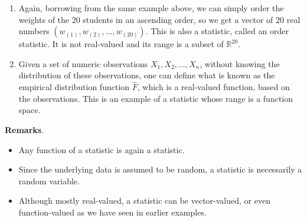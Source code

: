 \documentclass[12pt]{article}
\begin{document}
\begin{enumerate}
\item Again, borrowing from the same example above, we can simply order the weights of the 20 students in an ascending order, so we get a vector of 20 real numbers $(w_{(1)},w_{(2)},\ldots,w_{(20)})$.  This is also a statistic, called an order statistic.  It is not real-valued and its range is a subset of $\mathbb{R}^{20}$.
\item Given a set of numeric observations $X_1,X_2,\ldots,X_n$, without knowing the distribution of these observations, one can define what is known as the empirical distribution function $\hat{F}$, which is a real-valued function, based on the observations.  This is an example of a statistic whose range is a function space.
\end{enumerate}
\par
\textbf{Remarks}.
\begin{itemize}
\item Any function of a statistic is again a statistic.
\item Since the underlying data is assumed to be random, a statistic is necessarily a random variable.
\item Although mostly real-valued, a statistic can be vector-valued, or even function-valued as we have seen in earlier examples.
\end{itemize}
\end{document}
